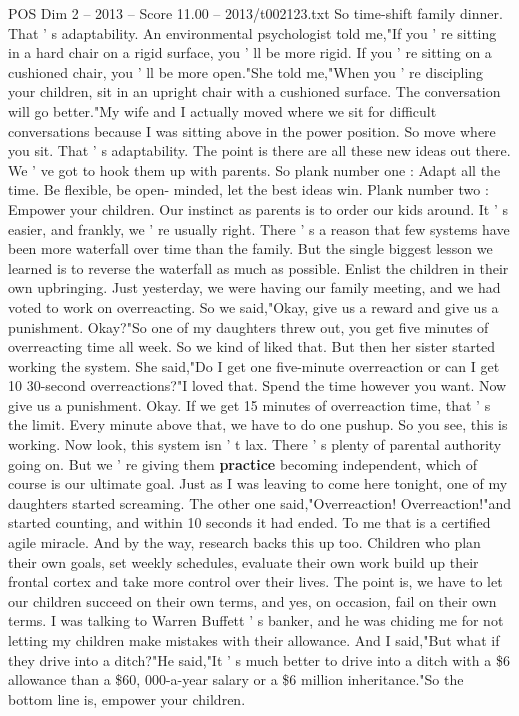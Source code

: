 \begin{textsample}{POS Dim 2 – 2013 – Score 11.00 – 2013/t002123.txt}
So time-shift family dinner.
That ' s adaptability.
An environmental psychologist told me,"If you ' re sitting in a hard chair on a rigid surface, you ' ll be more rigid.
If you ' re sitting on a cushioned chair, you ' ll be more open."She told me,"When you ' re discipling your children, sit in an upright chair with a cushioned surface.
The conversation will go better."My wife and I actually moved where we sit for difficult conversations because I was sitting above in the power position.
So move where you sit.
That ' s adaptability.
The point is there are all these new ideas out there.
We ' ve got to hook them up with parents.
So plank number one : Adapt all the time.
Be flexible, be open- minded, let the best ideas win.
Plank number two : Empower your children.
Our instinct as parents is to order our kids around.
It ' s easier, and frankly, we ' re usually right.
There ' s a reason that few systems have been more waterfall over time than the family.
But the single biggest lesson we learned is to reverse the waterfall as much as possible.
Enlist the children in their own upbringing.
Just yesterday, we were having our family meeting, and we had voted to work on overreacting.
So we said,"Okay, give us a reward and give us a punishment.
Okay?"So one of my daughters threw out, you get five minutes of overreacting time all week.
So we kind of liked that.
But then her sister started working the system.
She said,"Do I get one five-minute overreaction or can I get 10 30-second overreactions?"I loved that.
Spend the time however you want.
Now give us a punishment.
Okay.
If we get 15 minutes of overreaction time, that ' s the limit.
Every minute above that, we have to do one pushup.
So you see, this is working.
Now look, this system isn ' t lax.
There ' s plenty of parental authority going on.
But we ' re giving them \textbf{practice} becoming independent, which of course is our ultimate goal.
Just as I was leaving to come here tonight, one of my daughters started screaming.
The other one said,"Overreaction!
Overreaction!"and started counting, and within 10 seconds it had ended.
To me that is a certified agile miracle.
And by the way, research backs this up too.
Children who plan their own goals, set weekly schedules, evaluate their own work build up their frontal cortex and take more control over their lives.
The point is, we have to let our children succeed on their own terms, and yes, on occasion, fail on their own terms.
I was talking to Warren Buffett ' s banker, and he was chiding me for not letting my children make mistakes with their allowance.
And I said,"But what if they drive into a ditch?"He said,"It ' s much better to drive into a ditch with a \$6 allowance than a \$60, 000-a-year salary or a \$6 million inheritance."So the bottom line is, empower your children.

\end{textsample}
